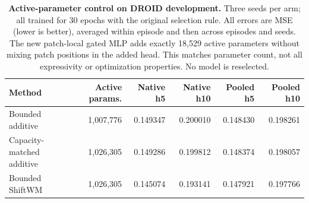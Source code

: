 \begin{table}[tbp]\centering\small
\begin{tabular}{@{}lrrrrr@{}}\toprule
Method & Active params. & Native h5 & Native h10 & Pooled h5 & Pooled h10 \\ \midrule
Bounded additive & 1,007,776 & 0.149347 & 0.200010 & 0.148430 & 0.198261 \\
Capacity-matched additive & 1,026,305 & 0.149286 & 0.199812 & 0.148374 & 0.198057 \\
Bounded ShiftWM & 1,026,305 & 0.145074 & 0.193141 & 0.147921 & 0.197766 \\
\bottomrule\end{tabular}
\caption{\textbf{Active-parameter control on DROID development.} Three seeds per arm;
all trained for 30 epochs with the original selection rule. All errors are MSE
(lower is better), averaged within episode and then across episodes and seeds.
The new patch-local gated MLP adds exactly 18,529 active parameters without
mixing patch positions in the added head. This matches parameter count, not
all expressivity or optimization properties. No model is reselected.}
\label{tab:capacity-control}\end{table}
